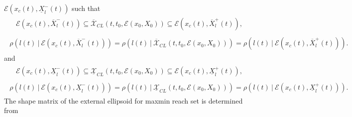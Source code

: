 \documentclass[letterpaper,10pt,english]{sphinxmanual}
\begin{document}
${\mathcal E}(x_c(t), \underline{X}^-_l(t))$ such that
\label{chap_reach:equation-maxmininclusion}\begin{gather}
\begin{split}{\mathcal E}(x_c(t), \overline{X}^-_l(t))\subseteq\overline{{\mathcal X}}_{CL}(t,t_0,{\mathcal E}(x_0,X_0))
\subseteq {\mathcal E}(x_c(t), \overline{X}^+_l(t)),\end{split}\label{chap_reach-maxmininclusion}
\end{gather}\label{chap_reach:equation-maxmintightness}\begin{gather}
\begin{split}\rho(l(t) ~|~ {\mathcal E}(x_c(t), \overline{X}^-_l(t))) =
\rho(l(t) ~|~ \overline{{\mathcal X}}_{CL}(t, t_0, {\mathcal E}(x_0,X_0))) =
\rho(l(t) ~|~ {\mathcal E}(x_c(t), \overline{X}^+_l(t))) .\end{split}\label{chap_reach-maxmintightness}
\end{gather}
and
\label{chap_reach:equation-minmaxinclusion}\begin{gather}
\begin{split}{\mathcal E}(x_c(t), \underline{X}^-_l(t))\subseteq\underline{{\mathcal X}}_{CL}(t,t_0,{\mathcal E}(x_0,X_0))
\subseteq {\mathcal E}(x_c(t), \underline{X}^+_l(t)),\end{split}\label{chap_reach-minmaxinclusion}
\end{gather}\label{chap_reach:equation-minmaxtightness}\begin{gather}
\begin{split}\rho(l(t) ~|~ {\mathcal E}(x_c(t), \underline{X}^-_l(t))) =
\rho(l(t) ~|~ \underline{{\mathcal X}}_{CL}(t, t_0, {\mathcal E}(x_0,X_0))) =
\rho(l(t) ~|~ {\mathcal E}(x_c(t), \underline{X}^+_l(t))) .\end{split}\label{chap_reach-minmaxtightness}
\end{gather}
The shape matrix of the external ellipsoid for maxmin reach set is
determined from
\end{document}
